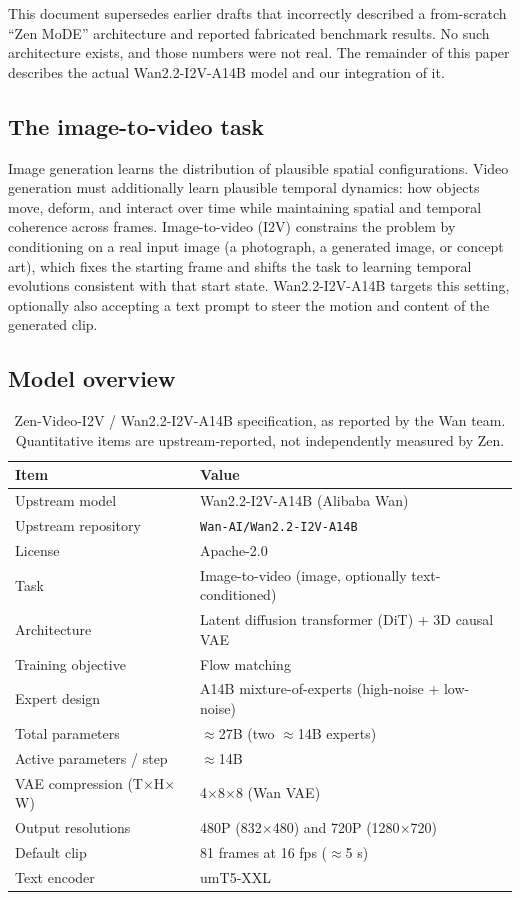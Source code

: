 \documentclass[11pt,a4paper]{article}
\begin{document}
This document supersedes earlier drafts that incorrectly described a from-scratch ``Zen MoDE'' architecture and reported fabricated benchmark results. No such architecture exists, and those numbers were not real. The remainder of this paper describes the actual Wan2.2-I2V-A14B model and our integration of it.

\subsection{The image-to-video task}

Image generation learns the distribution of plausible spatial configurations. Video generation must additionally learn plausible temporal dynamics: how objects move, deform, and interact over time while maintaining spatial and temporal coherence across frames. Image-to-video (I2V) constrains the problem by conditioning on a real input image (a photograph, a generated image, or concept art), which fixes the starting frame and shifts the task to learning temporal evolutions consistent with that start state. Wan2.2-I2V-A14B targets this setting, optionally also accepting a text prompt to steer the motion and content of the generated clip.

\subsection{Model overview}

\begin{table}[H]
\centering
\caption{Zen-Video-I2V / Wan2.2-I2V-A14B specification, as reported by the Wan team. Quantitative items are upstream-reported, not independently measured by Zen.}
\begin{tabular}{ll}
\toprule
\textbf{Item} & \textbf{Value} \\
\midrule
Upstream model & Wan2.2-I2V-A14B (Alibaba Wan) \\
Upstream repository & \texttt{Wan-AI/Wan2.2-I2V-A14B} \\
License & Apache-2.0 \\
Task & Image-to-video (image, optionally text-conditioned) \\
Architecture & Latent diffusion transformer (DiT) + 3D causal VAE \\
Training objective & Flow matching \\
Expert design & A14B mixture-of-experts (high-noise + low-noise) \\
Total parameters & $\approx$27B (two $\approx$14B experts) \\
Active parameters / step & $\approx$14B \\
VAE compression (T$\times$H$\times$W) & 4$\times$8$\times$8 (Wan VAE) \\
Output resolutions & 480P (832$\times$480) and 720P (1280$\times$720) \\
Default clip & 81 frames at 16 fps ($\approx$5 s) \\
Text encoder & umT5-XXL \\
\bottomrule
\end{tabular}
\end{table}
\end{document}

